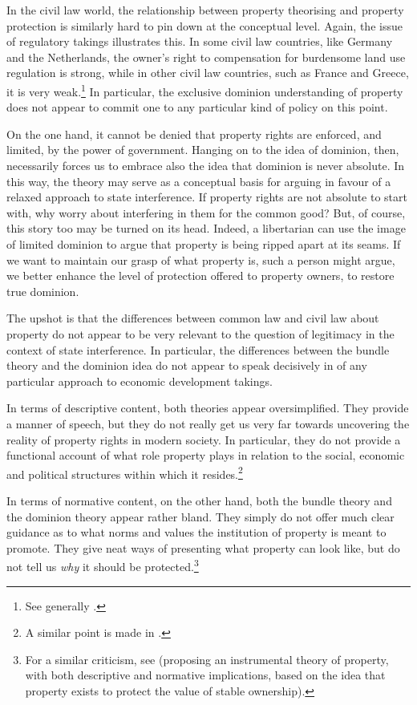 In the civil law world, the relationship between property theorising and property protection is similarly hard to pin down at the conceptual level. Again, the issue of regulatory takings illustrates this. In some civil law countries, like Germany and the Netherlands, the owner's right to compensation for burdensome land use regulation is strong, while in other civil law countries, such as France and Greece, it is very weak.\footnote{See generally \cite{alterman10}.} In particular, the exclusive dominion understanding of property does not appear to commit one to any particular kind of policy on this point. 

On the one hand, it cannot be denied that property rights are enforced, and limited, by the power of government. Hanging on to the idea of dominion, then, necessarily forces us to embrace also the idea that dominion is never absolute. In this way, the theory may serve as a conceptual basis for arguing in favour of a relaxed approach to state interference. If property rights are not absolute to start with, why worry about interfering in them for the common good? But, of course, this story too may be turned on its head. Indeed, a libertarian can use the image of limited dominion to argue that property is being ripped apart at its seams. If we want to maintain our grasp of what property is, such a person might argue, we better enhance the level of protection offered to property owners, to restore true dominion.

The upshot is that the differences between common law and civil law  about property do not appear to be very relevant to the question of legitimacy in the context of state interference. In particular, the differences between the bundle theory and the dominion idea do not appear to speak decisively in  of any particular approach to economic development takings.

In terms of descriptive content, both theories appear oversimplified. They provide a manner of speech, but they do not really get us very far towards uncovering the reality of property rights in modern society. In particular, they do not provide a functional account of what role property plays in relation to the social, economic and political structures within which it resides.\footnote{A similar point is made in \cite[2-6]{alexander12}.}

In terms of normative content, on the other hand, both the bundle theory and the dominion theory appear rather bland. They simply do not offer much clear guidance as to what norms and values the institution of property is meant to promote. They give neat ways of presenting what property can look like, but do not tell us {\it why} it should be protected.\footnote{For a similar criticism, see \cite[535-536]{bell05} (proposing an instrumental theory of property, with both descriptive and normative implications, based on the idea that property exists to protect the value of stable ownership).}

